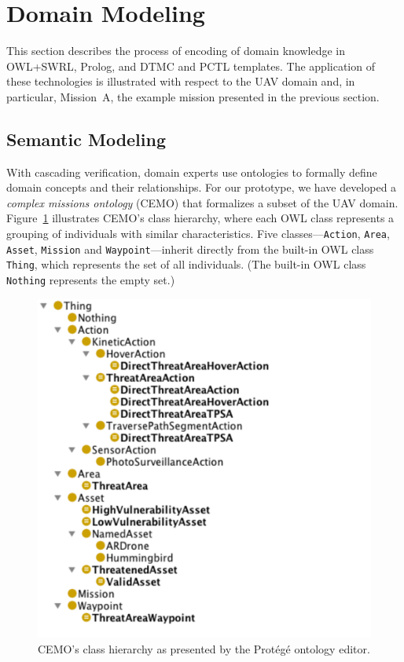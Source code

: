 \section{Domain Modeling}
\label{sec:Domain_Modeling}

\noindent This section describes the process of encoding of domain knowledge in OWL+SWRL, Prolog, and DTMC and PCTL templates. The application of these technologies is illustrated with respect to the UAV domain and, in particular, Mission~A, the example mission presented in the previous section.

\subsection{Semantic Modeling}
\label{sec:Semantic_Modeling}

\noindent With cascading verification, domain experts use ontologies to formally define domain concepts and their relationships. For our prototype, we have developed a \emph{complex missions ontology} (CEMO) that formalizes a subset of the UAV domain. Figure~\ref{fig:complex_missions_ontology} illustrates CEMO's class hierarchy, where each OWL class represents a grouping of individuals with similar characteristics. Five classes---\texttt{Action}, \texttt{Area}, \texttt{Asset}, \texttt{Mission} and \texttt{Waypoint}---inherit directly from the built-in OWL class \texttt{Thing}, which represents the set of all individuals. (The built-in OWL class \texttt{Nothing} represents the empty set.)

\begin{figure}
\includegraphics[scale=0.5]{img/cemo.pdf}
\caption{CEMO's class hierarchy as presented by the Prot\'eg\'e ontology editor.}
\label{fig:complex_missions_ontology}
\end{figure}

